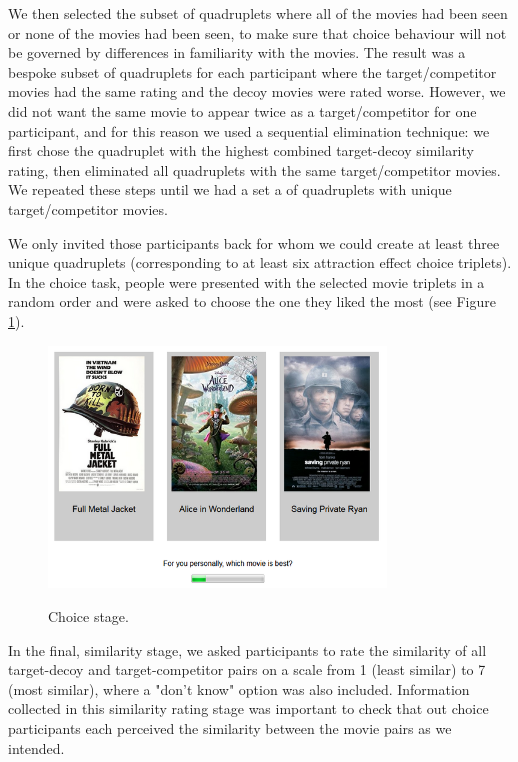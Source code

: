 \documentclass[12pt, a4paper]{article}
\begin{document}
We then selected the subset of quadruplets where all of the movies had been seen or none of the movies had been seen, to make sure that choice behaviour will not be governed by differences in familiarity with the movies. The result was a bespoke subset of quadruplets for each participant where the target/competitor movies had the same rating and the decoy movies were rated worse. However, we did not want the same movie to appear twice as a target/competitor for one participant, and for this reason we used a sequential elimination technique: we first chose the quadruplet with the highest combined target-decoy similarity rating, then eliminated all quadruplets with the same target/competitor movies. We repeated these steps until we had a set a of quadruplets with unique target/competitor movies.

We only invited those participants back for whom we could create at least three unique quadruplets (corresponding to at least six attraction effect choice triplets). In the choice task, people were presented with the selected movie triplets in a random order and were asked to choose the one they liked the most (see Figure \ref{fig:exp1_screenshot}).

\begin{figure}[htb!]
\centering
\captionsetup{justification=centering}
\caption{Choice stage.}
\includegraphics[width=0.8\textwidth]{rsz_exp1_choicestage.png}
\label{fig:exp1_screenshot}
\end{figure}

In the final, similarity stage, we asked participants to rate the similarity of all target-decoy and target-competitor pairs on a scale from 1 (least similar) to 7 (most similar), where a "don't know" option was also included. Information collected in this similarity rating stage was important to check that out choice participants each perceived the similarity between the movie pairs as we intended.
\end{document}
